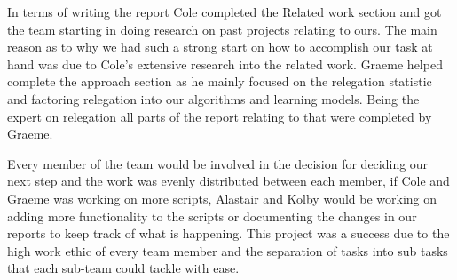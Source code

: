 \documentclass[conference]{IEEEtran}
\begin{document}
In terms of writing the report Cole completed the Related work section and got the team starting in doing research on past projects relating to ours. The main reason as to why we had such a strong start on how to accomplish our task at hand was due to Cole's extensive research into the related work. Graeme helped complete the approach section as he mainly focused on the relegation statistic and factoring relegation into our algorithms and learning models. Being the expert on relegation all parts of the report relating to that were completed by Graeme. 

Every member of the team would be involved in the decision for deciding our next step and the work was evenly distributed between each member, if Cole and Graeme was working on more scripts, Alastair and Kolby would be working on adding more functionality to the scripts or documenting the changes in our reports to keep track of what is happening. This project was a success due to the high work ethic of every team member and the separation of tasks into sub tasks that each sub-team could tackle with ease. 

\nocite{*}




\end{document}
